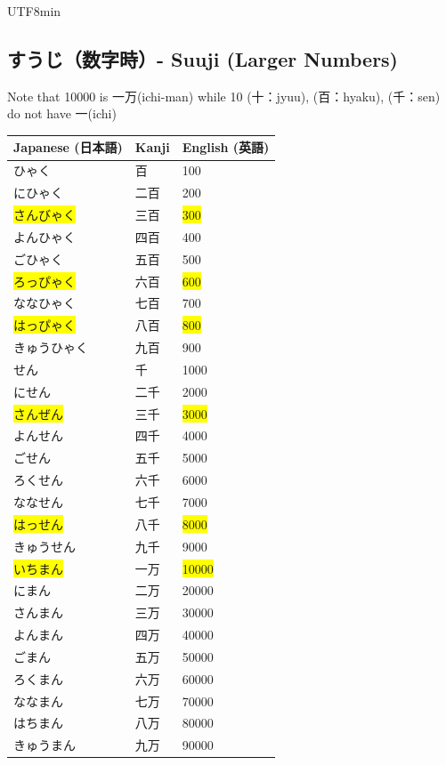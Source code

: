 \documentclass[11pt]{article}
\begin{document}
\begin{CJK}{UTF8}{min}
\subsection{すうじ（数字時）- Suuji (Larger Numbers)}
Note that 10000 is 一万(ichi-man) while 10 (十：jyuu), (百：hyaku), (千：sen) do not have 一(ichi)
\vspace{5pt}
\begin{tabularx}{\linewidth}{X | X | X}
    \toprule
    \textbf{Japanese (日本語)} & \textbf{Kanji} & \textbf{English (英語)} \\
    \midrule
    ひゃく & 百 & 100 \\
    にひゃく & 二百 & 200 \\
    \colorbox{yellow}{さんびゃく} & 三百 & \colorbox{yellow}{300} \\
    よんひゃく & 四百 & 400 \\
    ごひゃく & 五百 & 500 \\
    \colorbox{yellow}{ろっぴゃく} & 六百 & \colorbox{yellow}{600} \\
    ななひゃく & 七百 & 700 \\
    \colorbox{yellow}{はっぴゃく} & 八百 & \colorbox{yellow}{800} \\
    きゅうひゃく & 九百 & 900 \\
    せん & 千 & 1000 \\
    にせん & 二千 & 2000 \\
    \colorbox{yellow}{さんぜん} & 三千 & \colorbox{yellow}{3000} \\
    よんせん & 四千 & 4000 \\
    ごせん & 五千 & 5000 \\
    ろくせん & 六千 & 6000 \\
    ななせん & 七千 & 7000 \\
    \colorbox{yellow}{はっせん} & 八千 & \colorbox{yellow}{8000} \\
    きゅうせん & 九千 & 9000 \\
    \colorbox{yellow}{いちまん} & 一万 & \colorbox{yellow}{10000} \\
    にまん & 二万 & 20000 \\
    さんまん & 三万 & 30000 \\
    よんまん & 四万 & 40000 \\
    ごまん & 五万 & 50000 \\
    ろくまん & 六万 & 60000 \\
    ななまん & 七万 & 70000 \\
    はちまん & 八万 & 80000 \\
    きゅうまん & 九万 & 90000 \\
    \bottomrule
\end{tabularx}


\end{CJK}
\end{document}
